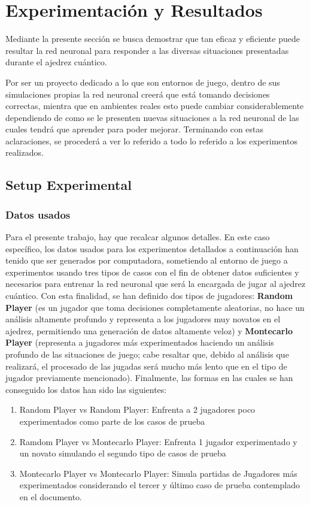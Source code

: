 \section{Experimentación y Resultados}

Mediante la presente sección se busca demostrar que tan eficaz y eficiente puede resultar la red neuronal para responder a las diversas situaciones presentadas durante el ajedrez cuántico.

Por ser un proyecto dedicado a lo que son entornos de juego, dentro de sus simulaciones propias la red neuronal creerá que está tomando decisiones correctas, mientra que en ambientes reales esto puede cambiar considerablemente dependiendo de como se le presenten nuevas situaciones a la red neuronal de las cuales tendrá que aprender para poder mejorar. Terminando con estas aclaraciones, se procederá a ver lo referido a todo lo referido a los experimentos realizados.

\subsection{Setup Experimental}
\subsubsection{Datos usados}

Para el presente trabajo, hay que recalcar algunos detalles. En este caso específico, los datos usados para los experimentos detallados a continuación han tenido que ser generados por computadora, sometiendo al entorno de juego a experimentos usando tres tipos de casos con el fin de obtener datos suficientes y necesarios para entrenar la red neuronal que será la encargada de jugar al ajedrez cuántico. Con esta finalidad, se han definido dos tipos de jugadores: \textbf{Random Player} (es un jugador que toma decisiones completamente aleatorias, no hace un análisis altamente profundo y representa a los jugadores muy novatos en el ajedrez, permitiendo una generación de datos altamente veloz) y \textbf{Montecarlo Player} (representa a jugadores más experimentados haciendo un análisis profundo de las situaciones de juego; cabe resaltar que, debido al análisis que realizará, el procesado de las jugadas será mucho más lento que en el tipo de jugador previamente mencionado). Finalmente, las formas en las cuales se han conseguido los datos han sido las siguientes:

\begin{enumerate}
    \item Random Player vs Random Player: Enfrenta a 2 jugadores poco experimentados como parte de los casos de prueba
    \item Ramdom Player vs Montecarlo Player: Enfrenta 1 jugador experimentado y un novato simulando el segundo tipo de casos de prueba
    \item Montecarlo Player vs Montecarlo Player: Simula partidas de Jugadores más experimentados considerando el tercer y último caso de prueba contemplado en el documento. 
\end{enumerate}

